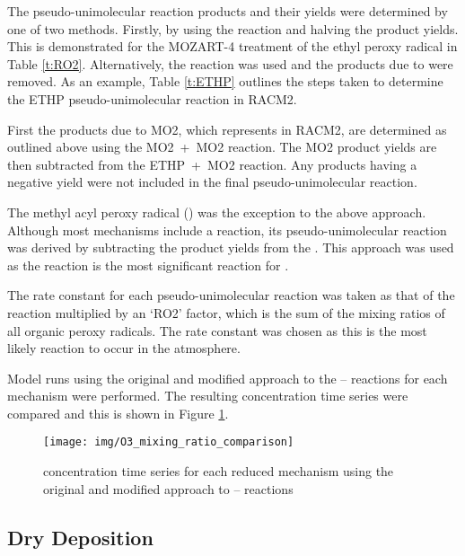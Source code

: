 The pseudo-unimolecular reaction products and their yields were determined by one of two methods.
Firstly, by using the  reaction and halving the product yields. 
This is demonstrated for the MOZART-4 treatment of the ethyl peroxy radical in Table \ref{t:RO2}. 
Alternatively, the  reaction was used and the products due to  were removed. 
As an example, Table \ref{t:ETHP} outlines the steps taken to determine the ETHP pseudo-unimolecular reaction in RACM2. 

First the products due to MO2, which represents  in RACM2, are determined as outlined above using the \mbox{MO2 + MO2} reaction. 
The MO2 product yields are then subtracted from the \mbox{ETHP + MO2} reaction. 
Any products having a negative yield were not included in the final pseudo-unimolecular reaction.

The methyl acyl peroxy radical () was the exception to the above approach. 
Although most mechanisms include a \mbox{} reaction, its pseudo-unimolecular reaction was derived by subtracting the  product yields from the \mbox{}. 
This approach was used as the \mbox{} reaction is the most significant reaction for .

The rate constant for each pseudo-unimolecular reaction was taken as that of the \mbox{} reaction multiplied by an `RO2' factor, which is the sum of the mixing ratios of all organic peroxy radicals. 
The \mbox{} rate constant was chosen as this is the most likely reaction to occur in the atmosphere. 

Model runs using the original and modified approach to the -- reactions for each mechanism were performed.
The resulting  concentration time series were compared and this is shown in Figure \ref{f:O3_concentrations}.
\begin{figure}
    \begin{center}
        \texttt{[image: img/O3\_mixing\_ratio\_comparison]}
        \caption{ concentration time series for each reduced mechanism using the original and modified approach to -- reactions}
        \label{f:O3_concentrations}
    \end{center}
\end{figure}


\subsection{Dry Deposition}

